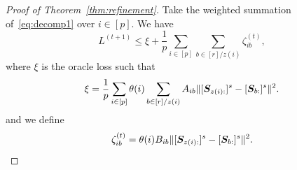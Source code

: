\documentclass[lettersize,onecolumn,journal]{IEEEtran}
\theoremstyle{definition}
\theoremstyle{definition}
\begin{document}
\begin{proof}[Proof of Theorem~\ref{thm:refinement}]
    {
    \color{blue} Take the weighted summation of~\eqref{eq:decomp1} over $i \in [p]$. We have 
    \begin{equation}
        L^{(t+1)} \leq \xi + \frac{1}{p}\sum_{i \in [p] }  \sum_{b \in [r]/z(i)}  \zeta_{ib}^{(t)}, 
    \end{equation}
    where $\xi$ is the oracle loss such that 
    \begin{equation}\label{eq:decomp2}
        \xi =   \frac{1}{p} \sum_{i \in [p] } \theta(i) \sum_{b \in [r]/z(i)} A_{ib} \onormSize{}{ [ \mS_{ z(i):}  ]^s - [ \mS_{b:}  ]^s  }^2.
    \end{equation}
    and we define
    \begin{equation}
        \zeta_{ib}^{(t)} =   \theta(i) B_{ib} \lVert [ \bm S_{ z(i):}  ]^s - [ \bm S_{b:}  ]^s  \rVert^2.
    \end{equation}
    
}
\end{proof}
\end{document}
